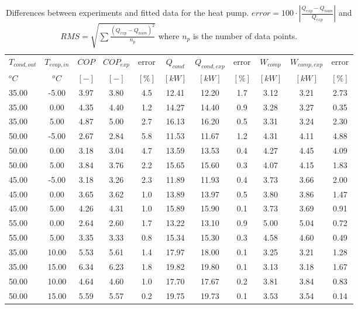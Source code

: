 \documentclass[english]{SPFShortReport}
\begin{document}
\begin{table}[!ht]
\begin{small}
\caption{Differences between experiments and fitted data for the heat pump.          $error=100 \cdot |\frac{Q_{exp}-Q_{num}}{Q_{exp}}|$ and $RMS = \sqrt { \sum{\frac{(Q_{exp}-Q_{num})^2}{n_p}} }$ where $n_p$ is the number of data points.}
\begin{center}
\resizebox{12cm}{!} 
{
\begin{tabular}{l | c c c c c c c c c c } 
\hline
\hline
$T_{cond,out}$ &$T_{evap,in}$ &$COP$ &$COP_{exp}$ &error &$Q_{cond}$ &$Q_{cond,exp}$ &error &$W_{comp}$ &$W_{comp,exp}$ &error \\ 
$^oC$ &$^oC$ &$[-]$ &$[-]$ &$[\%]$ &$[kW]$ &$[kW]$ &$[\%]$ &$[kW]$ &$[kW]$ &$[\%]$\\ 
\hline
35.00  & -5.00 & 3.97 & 3.80 & 4.5 & 12.41 & 12.20 & 1.7 & 3.12 & 3.21 & 2.73\\ 
35.00  & 0.00 & 4.35 & 4.40 & 1.2 & 14.27 & 14.40 & 0.9 & 3.28 & 3.27 & 0.35\\ 
35.00  & 5.00 & 4.87 & 5.00 & 2.7 & 16.13 & 16.20 & 0.5 & 3.31 & 3.24 & 2.30\\ 
50.00  & -5.00 & 2.67 & 2.84 & 5.8 & 11.53 & 11.67 & 1.2 & 4.31 & 4.11 & 4.88\\ 
50.00  & 0.00 & 3.18 & 3.04 & 4.7 & 13.59 & 13.53 & 0.4 & 4.27 & 4.45 & 4.09\\ 
50.00  & 5.00 & 3.84 & 3.76 & 2.2 & 15.65 & 15.60 & 0.3 & 4.07 & 4.15 & 1.83\\ 
45.00  & -5.00 & 3.18 & 3.26 & 2.3 & 11.89 & 11.93 & 0.4 & 3.73 & 3.66 & 2.00\\ 
45.00  & 0.00 & 3.65 & 3.62 & 1.0 & 13.89 & 13.97 & 0.5 & 3.80 & 3.86 & 1.47\\ 
45.00  & 5.00 & 4.26 & 4.31 & 1.0 & 15.89 & 15.90 & 0.1 & 3.73 & 3.69 & 0.91\\ 
55.00  & 0.00 & 2.64 & 2.60 & 1.7 & 13.22 & 13.10 & 0.9 & 5.00 & 5.04 & 0.72\\ 
55.00  & 5.00 & 3.35 & 3.33 & 0.8 & 15.34 & 15.30 & 0.3 & 4.58 & 4.60 & 0.49\\ 
35.00  & 10.00 & 5.53 & 5.61 & 1.4 & 17.97 & 18.00 & 0.1 & 3.25 & 3.21 & 1.28\\ 
35.00  & 15.00 & 6.34 & 6.23 & 1.8 & 19.82 & 19.80 & 0.1 & 3.13 & 3.18 & 1.67\\ 
50.00  & 10.00 & 4.64 & 4.60 & 1.0 & 17.70 & 17.67 & 0.2 & 3.81 & 3.84 & 0.83\\ 
50.00  & 15.00 & 5.59 & 5.57 & 0.2 & 19.75 & 19.73 & 0.1 & 3.53 & 3.54 & 0.14\\ 

\end{tabular}}
\end{center}
\end{small}
\end{table}
\end{document}
